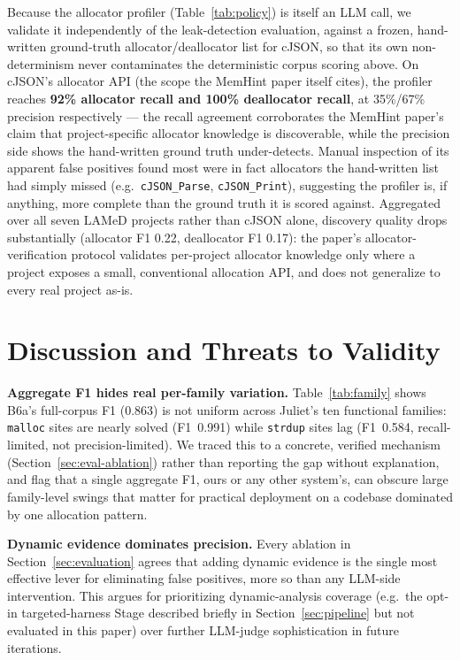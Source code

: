 \documentclass[11pt,a4paper]{article}
\begin{document}
Because the allocator profiler (Table~\ref{tab:policy}) is itself an LLM
call, we validate it independently of the leak-detection evaluation,
against a frozen, hand-written ground-truth allocator/deallocator list for
cJSON, so that its own non-determinism never contaminates the
deterministic corpus scoring above. On cJSON's allocator API (the scope
the MemHint paper itself cites), the profiler reaches \textbf{92\%
allocator recall and 100\% deallocator recall}, at 35\%/67\% precision
respectively --- the recall agreement corroborates the MemHint paper's
claim that project-specific allocator knowledge is discoverable, while the
precision side shows the hand-written ground truth under-detects. Manual
inspection of its apparent false positives found most were in fact
allocators the hand-written list had simply missed (e.g.\
\texttt{cJSON\_Parse}, \texttt{cJSON\_Print}), suggesting the profiler is,
if anything, more complete than the ground truth it is scored against.
Aggregated over all seven LAMeD projects rather than cJSON alone, discovery
quality drops substantially (allocator F1 0.22, deallocator F1 0.17): the
paper's allocator-verification protocol validates per-project allocator
knowledge only where a project exposes a small, conventional allocation
API, and does not generalize to every real project as-is.

\section{Discussion and Threats to Validity}
\label{sec:discussion}

\textbf{Aggregate F1 hides real per-family variation.} Table~\ref{tab:family}
shows B6a's full-corpus F1 (0.863) is not uniform across Juliet's ten
functional families: \texttt{malloc} sites are nearly solved (F1~0.991)
while \texttt{strdup} sites lag (F1~0.584, recall-limited, not
precision-limited). We traced this to a concrete, verified mechanism
(Section~\ref{sec:eval-ablation}) rather than reporting the gap without
explanation, and flag that a single aggregate F1, ours or any other
system's, can obscure large family-level swings that matter for
practical deployment on a codebase dominated by one allocation pattern.

\textbf{Dynamic evidence dominates precision.} Every ablation in
Section~\ref{sec:evaluation} agrees that adding dynamic evidence is the
single most effective lever for eliminating false positives, more so than
any LLM-side intervention. This argues for prioritizing dynamic-analysis
coverage (e.g.\ the opt-in targeted-harness Stage described briefly in
Section~\ref{sec:pipeline} but not evaluated in this paper) over further
LLM-judge sophistication in future iterations.
\end{document}
